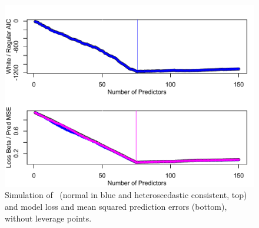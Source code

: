 \documentclass[12pt]{article}
\begin{document}
 \begin{figure}
 \caption{ Simulation of \aic\ (normal in blue and heteroscedastic consistent,
 top) and model loss and mean squared prediction errors (bottom), without
leverage points. }
 \label{fig:example2}
  \centerline{ \includegraphics[width=5in]{figures/leverage/example2.pdf} }
 \end{figure}


\end{document}
